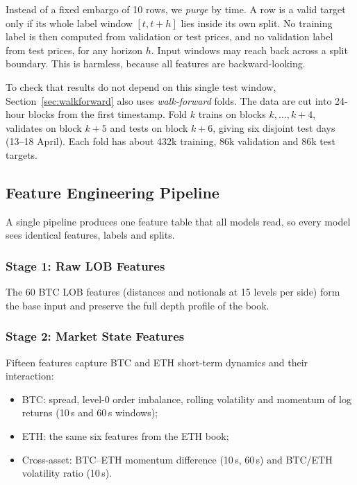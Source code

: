 Instead of a fixed embargo of 10 rows, we \emph{purge} by time. A row is a valid target
only if its whole label window $[t, t+h]$ lies inside its own split. No training label is
then computed from validation or test prices, and no validation label from test prices,
for any horizon $h$. Input windows may reach back across a split boundary. This is
harmless, because all features are backward-looking.

To check that results do not depend on this single test window, Section~\ref{sec:walkforward}
also uses \emph{walk-forward} folds. The data are cut into 24-hour blocks from the first
timestamp. Fold $k$ trains on blocks $k,\dots,k+4$, validates on block $k+5$ and tests on
block $k+6$, giving six disjoint test days (13--18 April). Each fold has about 432k
training, 86k validation and 86k test targets.


\subsection{Feature Engineering Pipeline}
\label{sec:features}
A single pipeline produces one feature table that all models read, so every model sees
identical features, labels and splits.

\subsubsection{Stage 1: Raw LOB Features}
The 60 BTC LOB features (distances and notionals at 15 levels per side) form the base
input and preserve the full depth profile of the book.

\subsubsection{Stage 2: Market State Features}
Fifteen features capture BTC and ETH short-term dynamics and their interaction:
\begin{itemize}
  \item BTC: spread, level-0 order imbalance, rolling volatility and momentum of log
  returns (10\,s and 60\,s windows);
  \item ETH: the same six features from the ETH book;
  \item Cross-asset: BTC--ETH momentum difference (10\,s, 60\,s) and BTC/ETH volatility
  ratio (10\,s).
\end{itemize}

